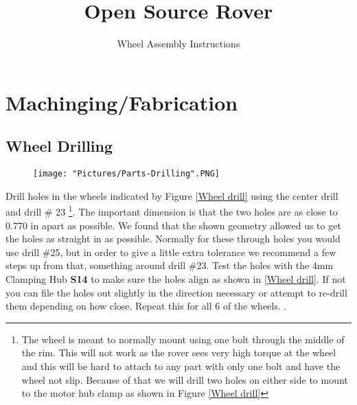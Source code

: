 \documentclass[12pt]{article}
\begin{document}
\title{Open Source Rover}
\author{Wheel Assembly Instructions}

\makeatletter         
\def\@maketitle{
\begin{center}	
	\makebox[\textwidth][c]{ \texttt{[image: "Pictures/Wheels/Wheels Title".png]}}
	{\Huge \bfseries \sffamily \@title }\\[4ex] 
	{\huge \bfseries \sffamily \@author}\\[4ex] 
	\texttt{[image: "Pictures/Misc/JPL logo".png]}
\end{center}}
\makeatother

\maketitle

\newpage


\tableofcontents

\newpage

\section{Machinging/Fabrication}

\subsection{Wheel Drilling}

\begin{figure}[H]
	\centering
	\texttt{[image: "Pictures/Parts-Drilling".PNG]}
\end{figure}

Drill holes in the wheels indicated by Figure \ref{Wheel drill} using the center drill and drill \# 23 \footnote{The wheel is meant to normally mount using one bolt through the middle of the rim. This will not work as the rover sees very high torque at the wheel and this will be hard to attach to any part with only one bolt and have the wheel not slip. Because of that we will drill two holes on either side to mount to the motor hub clamp as shown in Figure \ref{Wheel drill}}. The important dimension is that the two holes are as close to 0.770 in apart as possible. We found that the shown geometry allowed us to get the holes as straight in as possible. Normally for these through holes you would use drill \#25, but in order to give a little extra tolerance we recommend a few steps up from that, something around drill \#23. Test the holes with the 4mm Clamping Hub \textbf{S14} to make sure the holes align as shown in \ref{Wheel drill}. If not you can file the holes out slightly in the direction necessary or attempt to re-drill them depending on how close. Repeat this for all 6 of the wheels.
. 
\end{document}

